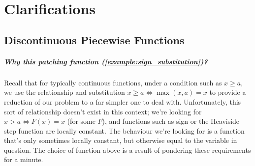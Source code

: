\chapter{Clarifications}
\section{Discontinuous Piecewise Functions}

\paragraph{Why this patching function (\autoref{example:sign_substitution})?}
\label{clarify:patch_auxillary}
Recall that for typically continuous functions, under a condition such as $x\geq a$, we use the relationship and substitution $x\geq a\iff \max(x,a)=x$ to provide a reduction of our problem to a far simpler one to deal with. Unfortunately, this sort of relationship doesn't exist in this context; we're looking for $x>a\iff F(x)=x$ (for some $F$), and functions such as sign or the Heaviside step function are locally constant. The behaviour we're looking for is a function that's only sometimes locally constant, but otherwise equal to the variable in question. The choice of function above is a result of pondering these requirements for a minute.